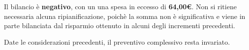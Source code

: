 	Il bilancio è \textbf{negativo}, con un una spesa in eccesso di \textbf{64,00\euro{}}. Non si ritiene necessaria alcuna ripianificazione, poichè la somma non è significativa e viene in parte bilanciata dal risparmio ottenuto in alcuni degli incrementi precedenti. 
	
	Date le considerazioni precedenti, il preventivo complessivo resta invariato.